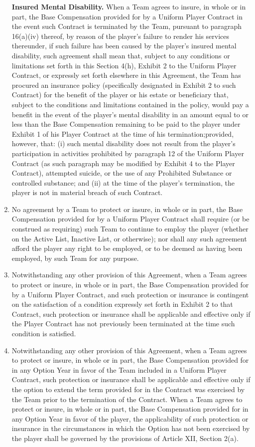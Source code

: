 \documentclass[
]{book}
\begin{document}
\begin{enumerate}
  \textbf{Insured Mental Disability.} When a Team agrees to insure, in whole or in part, the Base Compensation provided for by a Uniform Player Contract in the event such Contract is terminated by the Team, pursuant to paragraph 16(a)(iv) thereof, by reason of the player's failure to render his services thereunder, if such failure has been caused by the player's insured mental disability, such agreement shall mean that, subject to any conditions or limitations set forth in this Section 4(h), Exhibit 2 to the Uniform Player Contract, or expressly set forth elsewhere in this Agreement, the Team has procured an insurance policy (specifically designated in Exhibit 2 to such Contract) for the benefit of the player or his estate or beneficiary that, subject to the conditions and limitations contained in the policy, would pay a benefit in the event of the player's mental disability in an amount equal to or less than the Base Compensation remaining to be paid to the player under Exhibit 1 of his Player Contract at the time of his termination;provided, however, that: (i) such mental disability does not result from the player's participation in activities prohibited by paragraph 12 of the Uniform Player Contract (as such paragraph may be modified by Exhibit 4 to the Player Contract), attempted suicide, or the use of any Prohibited Substance or controlled substance; and (ii) at the time of the player's termination, the player is not in material breach of such Contract.
\item
  No agreement by a Team to protect or insure, in whole or in part, the Base Compensation provided for by a Uniform Player Contract shall require (or be construed as requiring) such Team to continue to employ the player (whether on the Active List, Inactive List, or otherwise); nor shall any such agreement afford the player any right to be employed, or to be deemed as having been employed, by such Team for any purpose.
\item
  Notwithstanding any other provision of this Agreement, when a Team agrees to protect or insure, in whole or in part, the Base Compensation provided for by a Uniform Player Contract, and such protection or insurance is contingent on the satisfaction of a condition expressly set forth in Exhibit 2 to that Contract, such protection or insurance shall be applicable and effective only if the Player Contract has not previously been terminated at the time such condition is satisfied.
\item
  Notwithstanding any other provision of this Agreement, when a Team agrees to protect or insure, in whole or in part, the Base Compensation provided for in any Option Year in favor of the Team included in a Uniform Player Contract, such protection or insurance shall be applicable and effective only if the option to extend the term provided for in the Contract was exercised by the Team prior to the termination of the Contract. When a Team agrees to protect or insure, in whole or in part, the Base Compensation provided for in any Option Year in favor of the player, the applicability of such protection or insurance in the circumstances in which the Option has not been exercised by the player shall be governed by the provisions of Article XII, Section 2(a).

\end{enumerate}
\end{document}
